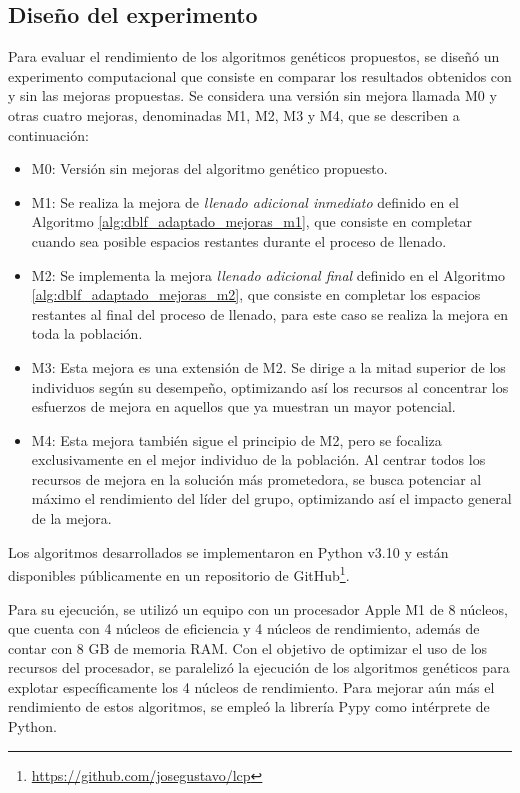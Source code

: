 \subsection{Diseño del experimento}

Para evaluar el rendimiento de los algoritmos genéticos propuestos, se diseñó un experimento computacional que consiste en comparar los resultados obtenidos con y sin las mejoras propuestas. Se considera una versión sin mejora llamada M0 y otras cuatro mejoras, denominadas M1, M2, M3 y M4, que se describen a continuación:

\begin{itemize}
    \item M0: Versión sin mejoras del algoritmo genético propuesto.
    \item M1: Se realiza la mejora de \textit{llenado adicional inmediato} definido en el Algoritmo \ref{alg:dblf_adaptado_mejoras_m1}, que consiste en completar cuando sea posible espacios restantes durante el proceso de llenado.
    \item M2: Se implementa la mejora \textit{llenado adicional final} definido en el Algoritmo \ref{alg:dblf_adaptado_mejoras_m2}, que consiste en completar los espacios restantes al final del proceso de llenado, para este caso se realiza la mejora en toda la población.
    \item M3: Esta mejora es una extensión de M2. Se dirige a la mitad superior de los individuos según su desempeño, optimizando así los recursos al concentrar los esfuerzos de mejora en aquellos que ya muestran un mayor potencial.
    \item M4: Esta mejora también sigue el principio de M2, pero se focaliza exclusivamente en el mejor individuo de la población. Al centrar todos los recursos de mejora en la solución más prometedora, se busca potenciar al máximo el rendimiento del líder del grupo, optimizando así el impacto general de la mejora.
\end{itemize}

Los algoritmos desarrollados se implementaron en Python v3.10 y están disponibles públicamente en un repositorio de GitHub\footnote{\url{https://github.com/josegustavo/lcp}}.

Para su ejecución, se utilizó un equipo con un procesador Apple M1 de 8 núcleos, que cuenta con 4 núcleos de eficiencia y 4 núcleos de rendimiento, además de contar con 8 GB de memoria RAM. Con el objetivo de optimizar el uso de los recursos del procesador, se paralelizó la ejecución de los algoritmos genéticos para explotar específicamente los 4 núcleos de rendimiento. Para mejorar aún más el rendimiento de estos algoritmos, se empleó la librería Pypy como intérprete de Python.


